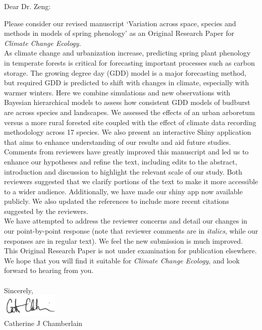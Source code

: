 \documentclass[11pt,a4paper]{letter}\usepackage[]{graphicx}\usepackage[]{color}
\begin{document}
\begin{letter}{}

\opening{Dear Dr. Zeng:}

\noindent Please consider our revised manuscript `Variation across space, species and methods in models of spring phenology' as an Original Research Paper for \emph{Climate Change Ecology.} 
\vspace{1.5ex}\\
As climate change and urbanization increase, predicting spring plant phenology in temperate forests is critical for forecasting important processes such as carbon storage. The growing degree day (GDD) model is a major forecasting method, but required GDD is predicted to shift with changes in climate, especially with warmer winters. Here we combine simulations and new observations with Bayesian hierarchical models to assess how consistent GDD models of budburst are across species and landscapes. We assessed the effects of an urban arboretum versus a more rural forested site coupled with the effect of climate data recording methodology across 17 species. We also present an interactive Shiny application that aims to enhance understanding of our results and aid future studies.
\vspace{1.5ex}\\ 
Comments from reviewers have greatly improved this manuscript and led us to enhance our hypotheses and refine the text, including edits to the abstract, introduction and discussion to highlight the relevant scale of our study. Both reviewers suggested that we clarify portions of the text to make it more accessible to a wider audience. Additionally, we have made our shiny app now available publicly. We also updated the references to include more recent citations suggested by the reviewers. 
\vspace{1.5ex}\\
We have attempted to address the reviewer concerns and detail our changes in our point-by-point response (note that reviewer comments are in \emph{italics}, while our responses are in regular text). We feel the new submission is much improved. This Original Research Paper is not under examination for publication elsewhere. We hope that you will find it suitable for \emph{Climate Change Ecology}, and look forward to hearing from you.
\\\vspace{-1ex}\\
\noindent Sincerely,\\

 \includegraphics[width=0.2\textwidth]{Full_Signature.jpg} \\
 

\noindent Catherine J Chamberlain


\end{letter}
\end{document}
